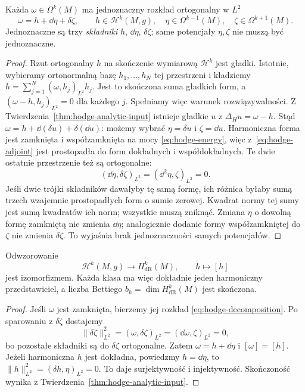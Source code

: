 \begin{twierdzenie}
\label{thm:hodge-decomposition}
Każda $\omega\in\Omega^k(M)$ ma jednoznaczny rozkład
ortogonalny w $L^2$
\begin{equation}\label{eq:hodge-decomposition}
 \omega=h+\dd\eta+\delta\zeta,
 \qquad h\in\mathcal H^k(M,g),\quad
 \eta\in\Omega^{k-1}(M),\quad
 \zeta\in\Omega^{k+1}(M).
\end{equation}
Jednoznaczne są trzy \emph{składniki} $h$, $\dd\eta$,
$\delta\zeta$; same potencjały $\eta,\zeta$
nie muszą być jednoznaczne.
\end{twierdzenie}
\begin{proof}
Rzut ortogonalny $h$ na skończenie wymiarową
$\mathcal H^k$ jest gładki.
Istotnie, wybieramy ortonormalną bazę $h_1,\ldots,h_N$
tej przestrzeni i kładziemy
$h=\sum_{j=1}^N(\omega,h_j)_{L^2}h_j$.
Jest to skończona suma gładkich form, a
$(\omega-h,h_j)_{L^2}=0$ dla każdego $j$.
Spełniamy więc warunek rozwiązywalności.
Z
Twierdzenia~\ref{thm:hodge-analytic-input} istnieje
gładkie $u$ z $\Delta_Hu=\omega-h$.
Stąd $\omega=h+\dd(\delta u)+\delta(\dd u)$:
możemy wybrać $\eta=\delta u$ i $\zeta=\dd u$.
Harmoniczna forma jest zamknięta i współzamknięta na mocy
\eqref{eq:hodge-energy}, więc z~\eqref{eq:hodge-adjoint}
jest prostopadła do form dokładnych i współdokładnych.
Te dwie ostatnie przestrzenie też są ortogonalne:
\[
 (\dd\eta,\delta\zeta)_{L^2}
 =(\dd^2\eta,\zeta)_{L^2}=0.
\]
Jeśli dwie trójki składników dawałyby tę samą formę,
ich różnica byłaby sumą trzech wzajemnie prostopadłych
form o sumie zerowej. Kwadrat normy tej sumy jest sumą
kwadratów ich norm; wszystkie muszą zniknąć.
Zmiana $\eta$ o dowolną formę zamkniętą nie zmienia
$\dd\eta$; analogicznie dodanie formy współzamkniętej
do $\zeta$ nie zmienia $\delta\zeta$.
To wyjaśnia brak jednoznaczności samych potencjałów.
\end{proof}

\begin{wniosek}
\label{cor:hodge-de-rham}
Odwzorowanie
\[
 \mathcal H^k(M,g)\longrightarrow H^k_{\mathrm{dR}}(M),
 \qquad h\longmapsto[h]
\]
jest izomorfizmem. Każda klasa ma więc dokładnie jeden
harmoniczny przedstawiciel, a liczba Bettiego
$b_k=\dim H^k_{\mathrm{dR}}(M)$ jest skończona.
\end{wniosek}
\begin{proof}
Jeśli $\omega$ jest zamknięta, bierzemy jej rozkład
\eqref{eq:hodge-decomposition}. Po sparowaniu z
$\delta\zeta$ dostajemy
\[
 \|\delta\zeta\|_{L^2}^2
 =(\omega,\delta\zeta)_{L^2}
 =(\dd\omega,\zeta)_{L^2}=0,
\]
bo pozostałe składniki są do $\delta\zeta$
ortogonalne. Zatem $\omega=h+\dd\eta$ i $[\omega]=[h]$.
Jeżeli harmoniczna $h$ jest dokładna, powiedzmy
$h=\dd\eta$, to
$\|h\|_{L^2}^2=(\delta h,\eta)_{L^2}=0$.
To daje surjektywność i injektywność. Skończoność
wynika z Twierdzenia~\ref{thm:hodge-analytic-input}.
\end{proof}

